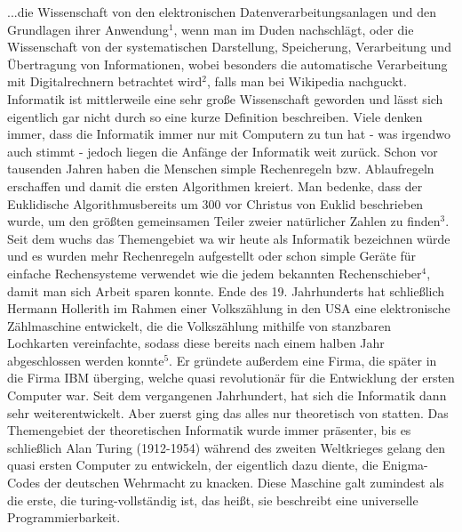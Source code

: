 \documentclass[12pt]{scrartcl}
\begin{document}
...\glqq die Wissenschaft von den elektronischen Datenverarbeitungsanlagen und den Grundlagen ihrer Anwendung\grqq $^1$, wenn man im Duden nachschlägt, oder \glqq die Wissenschaft von der systematischen Darstellung, Speicherung, Verarbeitung und Übertragung von Informationen, wobei besonders die automatische Verarbeitung mit Digitalrechnern betrachtet wird\grqq $^2$, falls man bei Wikipedia nachguckt.
\newline
\newline
Informatik ist mittlerweile eine sehr große Wissenschaft geworden und lässt sich eigentlich gar nicht durch so eine kurze Definition beschreiben. Viele denken immer, dass die Informatik immer nur mit Computern zu tun hat - was irgendwo auch stimmt - jedoch liegen die Anfänge der Informatik weit zurück. Schon vor tausenden Jahren haben die Menschen simple Rechenregeln bzw. Ablaufregeln erschaffen und damit die ersten Algorithmen kreiert. Man bedenke, dass der \glqq Euklidische Algorithmus\grqq  bereits um 300 vor Christus von Euklid beschrieben wurde, um den größten gemeinsamen Teiler zweier natürlicher Zahlen zu finden$^3$.
\newline
\newline
Seit dem wuchs das Themengebiet wa wir heute als Informatik bezeichnen würde und es wurden mehr Rechenregeln aufgestellt oder schon simple Geräte für einfache Rechensysteme verwendet wie die jedem bekannten Rechenschieber$^4$, damit man sich Arbeit sparen konnte. Ende des 19. Jahrhunderts hat schließlich Hermann Hollerith im Rahmen einer Volkszählung in den USA eine elektronische Zählmaschine entwickelt, die die Volkszählung mithilfe von stanzbaren Lochkarten vereinfachte, sodass diese bereits nach einem halben Jahr abgeschlossen werden konnte$^5$. Er gründete außerdem eine Firma, die später in die Firma IBM überging, welche quasi revolutionär für die Entwicklung der ersten Computer war.
\newline
\newline
Seit dem vergangenen Jahrhundert, hat sich die Informatik dann sehr weiterentwickelt. Aber zuerst ging das alles nur theoretisch von statten. Das Themengebiet der theoretischen Informatik wurde immer präsenter, bis es schließlich Alan Turing (1912-1954) während des zweiten Weltkrieges gelang den quasi ersten Computer zu entwickeln, der eigentlich dazu diente, die Enigma-Codes der deutschen Wehrmacht zu knacken. Diese Maschine galt zumindest als die erste, die turing-vollständig ist, das heißt, sie beschreibt eine universelle Programmierbarkeit.
\newline
\end{document}
